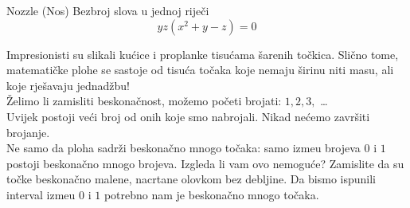 \begin{surferPage}{Nozzle (Nos)}
Bezbroj slova u jednoj rije\v{c}i\\
\smallskip
\[y z (x^2	+ y - z)	= 0\]

\vspace{0.3cm}
Impresionisti su slikali ku\'{c}ice i proplanke tisu\'{c}ama \v{s}arenih to\v{c}kica. Sli\v{c}no tome, matemati\v{c}ke plohe se sastoje od tisu\'{c}a to\v{c}aka koje nemaju \v{s}irinu niti masu, ali koje rje\v{s}avaju jednad\v{z}bu!\\
\vspace{0.3cm}
\v{Z}elimo li zamisliti beskona\v{c}nost, mo\v{z}emo po\v{c}eti brojati: $1, 2, 3,$ \dots\\
Uvijek postoji ve\'{c}i broj od onih koje smo nabrojali. Nikad ne\'{c}emo zavr\v{s}iti brojanje.\\
\vspace{0.3cm}
Ne samo da ploha sadr\v{z}i beskona\v{c}no mnogo to\v{c}aka: samo izme\dj{}u brojeva $0$ i $1$ postoji beskona\v{c}no mnogo brojeva. Izgleda li vam ovo nemogu\'{c}e? Zamislite da su to\v{c}ke beskona\v{c}no malene, nacrtane olovkom bez debljine. Da bismo ispunili interval izme\dj{}u $0$ i $1$ potrebno nam je beskona\v{c}no mnogo to\v{c}aka.
\end{surferPage}
